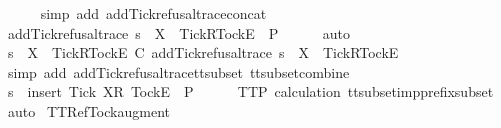 \ \ \ \ \isamarkupfalse%
\ {\isacharparenleft}simp\ add{\isacharcolon}\ add{\isacharunderscore}Tick{\isacharunderscore}refusal{\isacharunderscore}trace{\isacharunderscore}concat{\isacharparenright}\isanewline
\ \ \isamarkupfalse%
\ \isamarkupfalse%
\ {\isachardoublequoteopen}add{\isacharunderscore}Tick{\isacharunderscore}refusal{\isacharunderscore}trace\ s\ {\isacharat}\ {\isacharbrackleft}{\isacharbrackleft}X\ {\isasymunion}\ {\isacharbraceleft}Tick{\isacharbraceright}{\isacharbrackright}\isactrlsub R{\isacharcomma}{\isacharbrackleft}Tock{\isacharbrackright}\isactrlsub E{\isacharbrackright}\ {\isasymin}\ P{\isachardoublequoteclose}\isanewline
\ \ \ \ \isamarkupfalse%
\ auto\isanewline
\ \ \isamarkupfalse%
\ \isamarkupfalse%
\ {\isachardoublequoteopen}s\ {\isacharat}\ {\isacharbrackleft}{\isacharbrackleft}X\ {\isasymunion}\ {\isacharbraceleft}Tick{\isacharbraceright}{\isacharbrackright}\isactrlsub R{\isacharcomma}{\isacharbrackleft}Tock{\isacharbrackright}\isactrlsub E{\isacharbrackright}\ {\isasymsubseteq}\isactrlsub C\ add{\isacharunderscore}Tick{\isacharunderscore}refusal{\isacharunderscore}trace\ s\ {\isacharat}\ {\isacharbrackleft}{\isacharbrackleft}X\ {\isasymunion}\ {\isacharbraceleft}Tick{\isacharbraceright}{\isacharbrackright}\isactrlsub R{\isacharcomma}{\isacharbrackleft}Tock{\isacharbrackright}\isactrlsub E{\isacharbrackright}{\isachardoublequoteclose}\isanewline
\ \ \ \ \isamarkupfalse%
\ {\isacharparenleft}simp\ add{\isacharcolon}\ add{\isacharunderscore}Tick{\isacharunderscore}refusal{\isacharunderscore}trace{\isacharunderscore}tt{\isacharunderscore}subset\ tt{\isacharunderscore}subset{\isacharunderscore}combine{\isacharparenright}\isanewline
\ \ \isamarkupfalse%
\ \isamarkupfalse%
\ {\isachardoublequoteopen}s\ {\isacharat}\ {\isacharbrackleft}{\isacharbrackleft}insert\ Tick\ X{\isacharbrackright}\isactrlsub R{\isacharcomma}\ {\isacharbrackleft}Tock{\isacharbrackright}\isactrlsub E{\isacharbrackright}\ {\isasymin}\ P{\isachardoublequoteclose}\isanewline
\ \ \ \ \isamarkupfalse%
\ TT{}{\isacharunderscore}P\ calculation\ tt{\isacharunderscore}subset{\isacharunderscore}imp{\isacharunderscore}prefix{\isacharunderscore}subset\ \isamarkupfalse%
\ auto\isanewline
{}\isamarkupfalse%
%
\endisatagproof
{\isafoldproof}%
%
\isadelimproof
\isanewline
%
\endisadelimproof
\isanewline
{}\isamarkupfalse%
\ TT{}{\isacharunderscore}Ref{\isacharunderscore}Tock{\isacharunderscore}augment{\isacharcolon}\isanewline
